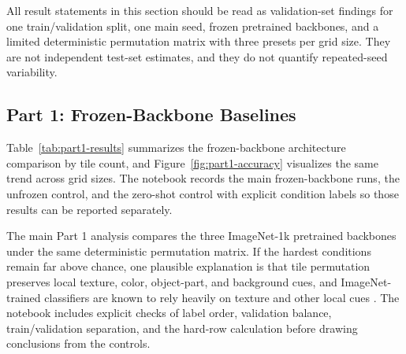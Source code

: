 \documentclass[12pt]{article}
\begin{document}
All result statements in this section should be read as validation-set findings for one train/validation split, one main seed, frozen pretrained backbones, and a limited deterministic permutation matrix with three presets per grid size. They are not independent test-set estimates, and they do not quantify repeated-seed variability.

\subsection{Part 1: Frozen-Backbone Baselines}
\label{sec:part1-results}

Table~\ref{tab:part1-results} summarizes the frozen-backbone architecture comparison by tile count, and Figure~\ref{fig:part1-accuracy} visualizes the same trend across grid sizes. The notebook records the main frozen-backbone runs, the unfrozen control, and the zero-shot control with explicit condition labels so those results can be reported separately.

\begin{table}[t]
  \centering
  \small
  \caption{Part 1 mean best validation accuracy by model and tile count, aggregated across the easy, medium, and hard deterministic records at each grid size.}
  \label{tab:part1-results}
\end{table}

The main Part 1 analysis compares the three ImageNet-1k pretrained backbones under the same deterministic permutation matrix. If the hardest conditions remain far above chance, one plausible explanation is that tile permutation preserves local texture, color, object-part, and background cues, and ImageNet-trained classifiers are known to rely heavily on texture and other local cues \citep{geirhos2019imagenet,hermann2020origins}. The notebook includes explicit checks of label order, validation balance, train/validation separation, and the hard-row calculation before drawing conclusions from the controls.
\end{document}
